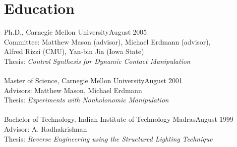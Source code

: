 
\section{Education}
\noindent
Ph.D., Carnegie Mellon University\hfill August 2005\\
Committee: Matthew Mason (advisor), Michael Erdmann (advisor),\\ 
Alfred Rizzi (CMU), Yan-bin Jia (Iowa State)\\
Thesis:  \textit{Control Synthesis for Dynamic Contact Manipulation}\\
\\
Master of Science, Carnegie Mellon University\hfill August 2001\\
Advisors: Matthew Mason, Michael Erdmann\\
Thesis:  \textit{Experiments with Nonholonomic Manipulation}\\
\\
Bachelor of Technology, Indian Institute of Technology Madras\hfill August 1999\\
Advisor: A. Radhakrishnan\\
Thesis: \textit{Reverse Engineering using the Structured Lighting Technique}

